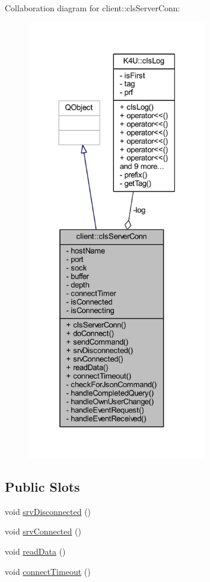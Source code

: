 Collaboration diagram for client\-:\-:cls\-Server\-Conn\-:\nopagebreak
\begin{figure}[H]
\begin{center}
\leavevmode
\includegraphics[height=550pt]{db/d6b/classclient_1_1cls_server_conn__coll__graph}
\end{center}
\end{figure}
\subsection*{Public Slots}
\begin{DoxyCompactItemize}
\item 
void \hyperlink{classclient_1_1cls_server_conn_acd2aa4131c06ed51738fb041c86ed640}{srv\-Disconnected} ()
\item 
void \hyperlink{classclient_1_1cls_server_conn_adaecfe74ef1fb16f35613587aa1dada8}{srv\-Connected} ()
\item 
void \hyperlink{classclient_1_1cls_server_conn_a0f7c8da07639a563b9d88780eb22748e}{read\-Data} ()
\item 
void \hyperlink{classclient_1_1cls_server_conn_a5ec4520ae6b50789ef650436b6339d43}{connect\-Timeout} ()
\end{DoxyCompactItemize}
